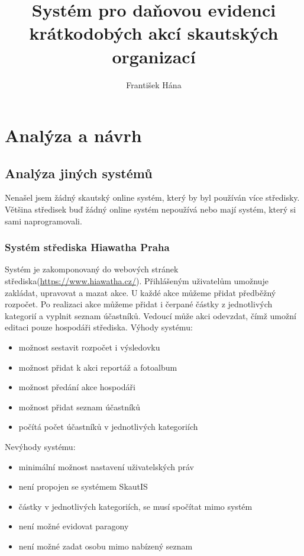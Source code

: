 \documentclass[thesis=B,czech]{FITthesis}[2011/06/14]
\title{Systém pro daňovou evidenci krátkodobých akcí skautských organizací}
\author{František Hána} %
\begin{document}

\begin{introduction}
\end{introduction}

\chapter{Analýza a návrh}
\section{Analýza jiných systémů}
Nenašel jsem žádný skautský online systém, který by byl používán více středisky. Většina středisek buď žádný online systém nepoužívá nebo mají systém, který si sami naprogramovali.
\subsection{Systém střediska Hiawatha Praha}
Systém je zakomponovaný do webových stránek střediska(\url{https://www.hiawatha.cz/}). Přihlášeným uživatelům umožnuje zakládat, upravovat a mazat akce. U každé akce můžeme přidat předběžný rozpočet. Po realizaci akce můžeme přidat i čerpané částky z jednotlivých kategorií a vyplnit seznam účastníků. Vedoucí může akci odevzdat, čímž umožní editaci pouze hospodáři střediska.
Výhody systému:
\begin{itemize}
	\item možnost sestavit rozpočet i výsledovku
	\item možnost přidat k akci reportáž a fotoalbum
	\item možnost předání akce hospodáři
	\item možnost přidat seznam účastníků
	\item počítá počet účastníků v jednotlivých kategoriích
\end{itemize}
Nevýhody systému:
\begin{itemize}
	\item minimální možnost nastavení uživatelských práv
	\item není propojen se systémem SkautIS
	\item částky v jednotlivých kategoriích, se musí spočítat mimo systém
	\item není možné evidovat paragony
	\item není možné zadat osobu mimo nabízený seznam
\end{itemize}
\end{document}
